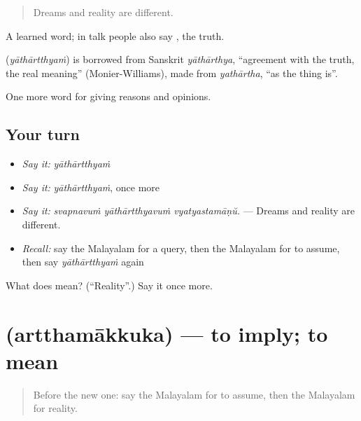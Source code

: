 \begin{quote}
Dreams and reality are different.
\end{quote}

A learned word; in talk people also say , the truth.

\begin{cousinweb}
\textbf{} (\emph{yāthārtthyaṁ}) is borrowed from Sanskrit \emph{yāthārthya}, \textquotedblleft{}agreement with the truth, the real meaning\textquotedblright{} (Monier-Williams), made from \emph{yathārtha}, \textquotedblleft{}as the thing is\textquotedblright{}.
\end{cousinweb}

\begin{grammarlens}[title={What you've built}]
One more word for giving reasons and opinions.
\end{grammarlens}

\subsection*{Your turn}
\begin{itemize}
\raggedright
  \item \emph{Say it:} \emph{yāthārtthyaṁ}
  \item \emph{Say it:} \emph{yāthārtthyaṁ}, once more
  \item \emph{Say it:} \emph{svapnavuṁ yāthārtthyavuṁ vyatyastamāṇŭ.} — Dreams and reality are different.
  \item \emph{Recall:} say the Malayalam for a query, then the Malayalam for to assume, then say \emph{yāthārtthyaṁ} again
\end{itemize}

\begin{tcolorbox}[breakable,colback=teal!4,colframe=teal!35!black,title={Before you move on}]
What does  mean? (\textquotedblleft{}Reality\textquotedblright{}.) Say it once more.
\end{tcolorbox}
\section[\texorpdfstring{\ml{അർത്ഥമാക്കുക} (artthamākkuka)}{അർത്ഥമാക്കുക (artthamākkuka)}]{ (artthamākkuka) — to imply; to mean}

\label{lesson:ML-C407-artthamakkuka}



\begin{quote}
Before the new one: say the Malayalam for to assume, then the Malayalam for reality.
\end{quote}

